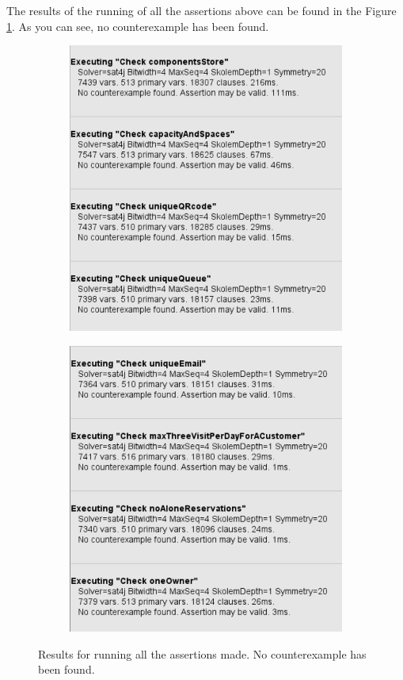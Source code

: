 \documentclass[a4paper, 12pt, oneside]{article}
\begin{document}
The results of the running of all the assertions above can be found in the Figure \ref{check_alloy}. As you can see, no counterexample has been found.
\newpage
\begin{figure}[h!]
\centering
\begin{subfigure}
    \centering
    \includegraphics[height=0.4\textheight, scale=0.2, keepaspectratio]{img/alloy/img_check_1.PNG}
 \end{subfigure}
 \begin{subfigure}
    \centering
    \includegraphics[height=0.4\textheight, scale=0.2, keepaspectratio]{img/alloy/img_check_2.PNG}
 \end{subfigure}
    \caption{Results for running all the assertions made. No counterexample has been found.}
    \label{check_alloy}
\end{figure}
\end{document}
